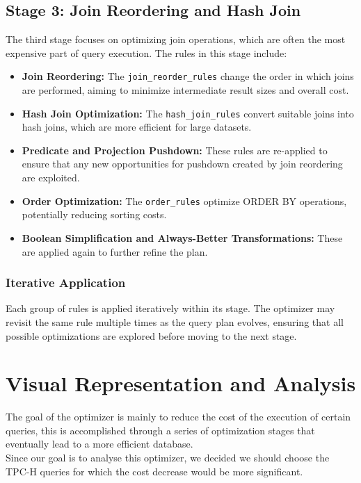 \documentclass[a4paper,12pt]{scrreprt}
\begin{document}
\section{Stage 3: Join Reordering and Hash Join}
The third stage focuses on optimizing join operations, which are often the most expensive part of query execution. The rules in this stage include:
\begin{itemize}
    \item \textbf{Join Reordering:} The \texttt{join\_reorder\_rules} change the order in which joins are performed, aiming to minimize intermediate result sizes and overall cost.
    \item \textbf{Hash Join Optimization:} The \texttt{hash\_join\_rules} convert suitable joins into hash joins, which are more efficient for large datasets.
    \item \textbf{Predicate and Projection Pushdown:} These rules are re-applied to ensure that any new opportunities for pushdown created by join reordering are exploited.
    \item \textbf{Order Optimization:} The \texttt{order\_rules} optimize ORDER BY operations, potentially reducing sorting costs.
    \item \textbf{Boolean Simplification and Always-Better Transformations:} These are applied again to further refine the plan.
\end{itemize}

\subsection{Iterative Application}
Each group of rules is applied iteratively within its stage. The optimizer may revisit the same rule multiple times as the query plan evolves, ensuring that all possible optimizations are explored before moving to the next stage.


\chapter{Visual Representation and Analysis} \label{chap:concDesenho}
\thispagestyle{fancy}
The goal of the optimizer is mainly to reduce the cost of the execution of certain queries, this is accomplished through a series of optimization stages that eventually lead to a more efficient database. \\
Since our goal is to analyse this optimizer, we decided we should choose the TPC-H queries for which the cost decrease would be more significant. \\
\end{document}
